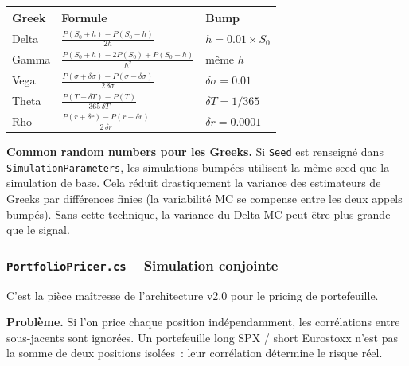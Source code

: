 \documentclass[a4paper,11pt]{article}
\newcommand{\cs}[1]{\texttt{\color{codeinline}#1}}
\begin{document}
\begin{center}
\begin{tabularx}{\textwidth}{l l X}
\toprule
\textbf{Greek} & \textbf{Formule} & \textbf{Bump} \\
\midrule
Delta & $\frac{P(S_0+h) - P(S_0-h)}{2h}$ & $h = 0.01 \times S_0$ \\
Gamma & $\frac{P(S_0+h) - 2P(S_0) + P(S_0-h)}{h^2}$ & m\^eme $h$ \\
Vega  & $\frac{P(\sigma+\delta\sigma) - P(\sigma-\delta\sigma)}{2\,\delta\sigma}$ & $\delta\sigma = 0.01$ \\
Theta & $\frac{P(T-\delta T) - P(T)}{365\,\delta T}$ & $\delta T = 1/365$ \\
Rho   & $\frac{P(r+\delta r) - P(r-\delta r)}{2\,\delta r}$ & $\delta r = 0.0001$ \\
\bottomrule
\end{tabularx}
\end{center}

\begin{tcolorbox}[constraint]
\textbf{Common random numbers pour les Greeks.} Si \cs{Seed} est renseign\'e dans
\cs{SimulationParameters}, les simulations bump\'ees utilisent la m\^eme seed que la
simulation de base. Cela r\'eduit drastiquement la variance des estimateurs de Greeks
par diff\'erences finies (la variabilit\'e MC se compense entre les deux appels bump\'es).
Sans cette technique, la variance du Delta MC peut \^etre plus grande que le signal.
\end{tcolorbox}

\subsubsection{\texttt{PortfolioPricer.cs} -- Simulation conjointe}

C'est la pi\`ece ma\^itresse de l'architecture v2.0 pour le pricing de portefeuille.

\textbf{Probl\`eme.} Si l'on price chaque position ind\'ependamment, les corr\'elations
entre sous-jacents sont ignor\'ees. Un portefeuille long SPX / short Eurostoxx n'est
pas la somme de deux positions isol\'ees~: leur corr\'elation d\'etermine le risque r\'eel.
\end{document}
